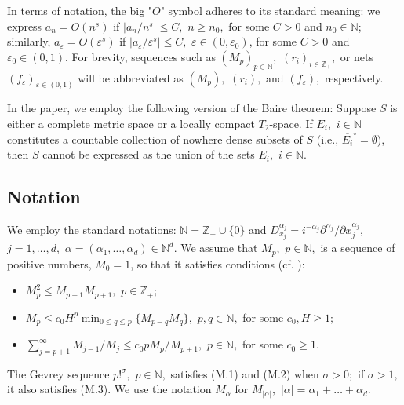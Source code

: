 \documentclass[sn-mathphys,Numbered]{sn-jnl}%
\theoremstyle{thmstyleone}%
\theoremstyle{thmstyletwo}%
\theoremstyle{thmstylethree}%
\begin{document}
In terms of notation, the big "$O$" symbol adheres to its standard meaning: we express  $a_n=O(n^s)$   if $|a_n/n^s|\leq C, $ $n\geq n_0,$  for some $C>0$  and $n_0\in\mathbb N$; similarly,  $a_\varepsilon=O(\varepsilon^s)$ if  $|a_\varepsilon/\varepsilon^s|\leq C, $ $\varepsilon\in (0,\varepsilon_0)$, for some $C>0$ and $\varepsilon_0\in(0,1).$ For brevity, sequences such as $(M_p)_{p\in\mathbb{N}}, $ $(r_i)_{i\in\mathbb{Z}_+},$ or nets $(f_\varepsilon)_{\varepsilon\in (0,1)}$ will be abbreviated as $(M_p), $ $(r_i),$ and $(f_\varepsilon),$ respectively.

In the paper, we employ the following version of the Baire theorem: Suppose $S$ is either a complete metric space or a locally compact $T_2$-space.  If $E_i,$ $i\in \mathbb{N}$ constitutes a countable collection of nowhere dense subsets of $S$ (i.e., $ \overline{E_i}^\circ=\emptyset$), then $S$ cannot be expressed as the union of the sets $E_i,$ $i\in \mathbb{N}.$

\subsection{Notation}\label{bas-def}

We employ the standard notations: $\mathbb N=\mathbb Z_+\cup\{0\}$ and $D^{\alpha_j}_{x_j}=i^{-\alpha_j}\partial^{\alpha_j}/\partial x_j^{\alpha_j}, $ $j=1,\ldots,d, $ $\alpha=(\alpha_1,\dots,\alpha_d) \in\mathbb N^d$.   We assume that $M_p, $ $p\in\mathbb N,$ is a sequence of positive numbers, $M_0=1$, %
so that it satisfies conditions (cf. \cite{Komatsu1}):
\begin{itemize}
\item[(M.1)] $M_{p}^{2} \leq M_{p-1} M_{p+1},$ $p \in\mathbb Z_+;$
\item[(M.2)] $M_{p} \leq c_0H^{p} \min_{0\leq q\leq p} \{M_{p-q} M_{q}\},$  $p,q\in \mathbb N,$ for some $c_0,H\geq 1;$
\item[(M.3)] $\sum_{j=p+1}^{\infty}M_{j-1}/M_j\leq c_0pM_p/M_{p+1},$ $p\in\mathbb N,$ for some $c_0\geq 1.$
\end{itemize}
The Gevrey sequence $p!^{\sigma},$ $p\in\mathbb N,$ satisfies (M.1) and (M.2) when $\sigma>0;$ if $\sigma>1,$ it also satisfies (M.3).  We  use the notation $M_{\alpha}$ for $M_{|\alpha|},$ $|\alpha|=\alpha_1+\dots+\alpha_d.$
\end{document}
